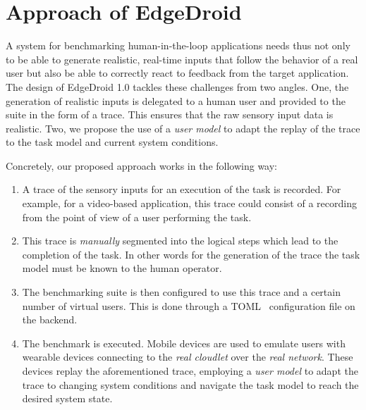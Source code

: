 \section{Approach of EdgeDroid}\label{paper:olguinmunoz2019edgedroid:sec:approach}

A system for benchmarking human-in-the-loop applications needs thus not only to be able to generate realistic, real-time inputs that follow the behavior of a real user but also be able to correctly react to feedback from the target application.
The design of EdgeDroid 1.0 tackles these challenges from two angles.
One, the generation of realistic inputs is delegated to a human user and provided to the suite in the form of a trace.
This ensures that the raw sensory input data is realistic.
Two, we propose the use of a \emph{user model} to adapt the replay of the trace to the task model and current system conditions.

Concretely, our proposed approach works in the following way:
\begin{enumerate}
    \item A trace of the sensory inputs for an execution of the task is recorded.
          For example, for a video-based application, this trace could consist of a recording from the point of view of a user performing the task.
    \item This trace is \emph{manually} segmented into the logical steps which lead to the completion of the task.
          In other words for the generation of the trace the task model must be known to the human operator.
    \item The benchmarking suite is then configured to use this trace and a certain number of virtual users.
          This is done through a TOML~\cite{toml} configuration file on the backend.
    \item The benchmark is executed.
          Mobile devices are used to emulate users with wearable devices connecting to the \emph{real cloudlet} over the \emph{real network}.
          These devices replay the aforementioned trace, employing a \emph{user model} to adapt the trace to changing system conditions and navigate the task model to reach the desired system state.
\end{enumerate}

